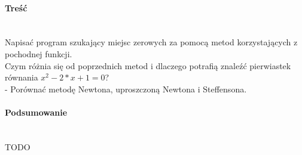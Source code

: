\paragraph{Treść}~\\
Napisać program szukający miejsc zerowych za pomocą metod korzystających z pochodnej funkcji.\\
Czym różnia się od poprzednich metod i dlaczego potrafią znaleźć pierwiastek równania $ x^2 - 2*x + 1 = 0 $?\\
- Porównać metodę Newtona, uproszczoną Newtona i Steffensona.\\

\paragraph{Podsumowanie}~\\
TODO
